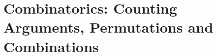\chapter{Combinatorics: Counting Arguments, Permutations and Combinations}
\label{chap:Combinatorics}